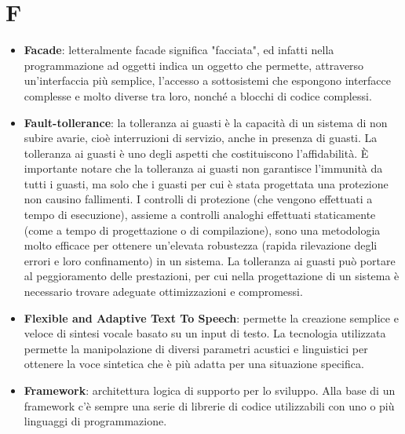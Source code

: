 \section{F}
\begin{itemize}
	\item
	\textbf{Facade}: letteralmente facade significa "facciata", ed infatti nella programmazione ad oggetti indica un oggetto che permette, attraverso un'interfaccia più semplice, l'accesso a sottosistemi che espongono interfacce complesse e molto diverse tra loro, nonché a blocchi di codice complessi. 
	\item
	\textbf{Fault-tollerance}: la tolleranza ai guasti è la capacità di un sistema di non subire avarie, cioè interruzioni di servizio, anche in presenza di guasti. La tolleranza ai guasti è uno degli aspetti che costituiscono l'affidabilità. È importante notare che la tolleranza ai guasti non garantisce l'immunità da tutti i guasti, ma solo che i guasti per cui è stata progettata una protezione non causino fallimenti.
	I controlli di protezione (che vengono effettuati a tempo di esecuzione), assieme a controlli analoghi effettuati staticamente (come a tempo di progettazione o di compilazione), sono una metodologia molto efficace per ottenere un'elevata robustezza (rapida rilevazione degli errori e loro confinamento) in un sistema.
	La tolleranza ai guasti può portare al peggioramento delle prestazioni, per cui nella progettazione di un sistema è necessario trovare adeguate ottimizzazioni e compromessi.
	\item
	\textbf{Flexible and Adaptive Text To Speech}: permette la creazione semplice e veloce di sintesi vocale basato su un input di testo. La tecnologia utilizzata permette la manipolazione di diversi parametri acustici e linguistici per ottenere la voce sintetica che è più adatta per una situazione specifica. 
	\item
	\textbf{Framework}: architettura logica di supporto per lo sviluppo. Alla base di un framework c’è sempre una serie di librerie di codice utilizzabili con uno o più linguaggi di programmazione.
\end{itemize}